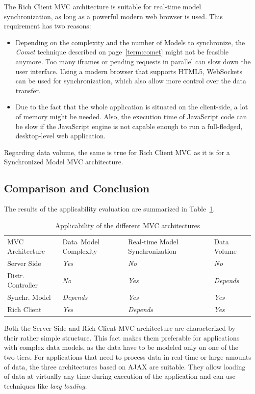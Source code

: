 The Rich Client MVC architecture is suitable for real-time model synchronization, as long as a powerful modern web browser is used. This requirement has two reasons:
\begin{itemize}
	\item Depending on the complexity and the number of Models to synchronize, the \emph{Comet} technique described on page~\ref{term:comet} might not be feasible anymore. Too many iframes or pending requests in parallel can slow down the user interface. Using a modern browser that supports HTML5, WebSockets can be used for synchronization, which also allow more control over the data transfer.
	\item Due to the fact that the whole application is situated on the client-side, a lot of memory might be needed. Also, the execution time of JavaScript code can be slow if the JavaScript engine is not capable enough to run a full-fledged, desktop-level web application.
\end{itemize}

Regarding data volume, the same is true for Rich Client MVC as it is for a Synchronized Model MVC architecture.

\subsection{Comparison and Conclusion}

The results of the applicability evaluation are summarized in Table~\ref{tab:comparison}.

\begin{table}[H]
	\centering
	\begin{tabular}{l p{2.4cm} p{3cm} p{3cm} }
\rowcolor{lightgray}
MVC Architecture & Data\ Model Complexity & Real-time Model Synchronization & Data Volume\\
Server Side & \cellcolor{green}\emph{Yes} & \cellcolor{red}\emph{No} & \cellcolor{red}\emph{No}\\
Distr. Controller & \cellcolor{red}\emph{No} & \cellcolor{green}\emph{Yes} & \emph{Depends}\\
Synchr. Model & \emph{Depends} & \cellcolor{green}\emph{Yes} & \cellcolor{green}\emph{Yes}\\
Rich Client & \cellcolor{green}\emph{Yes} & \emph{Depends} & \cellcolor{green}\emph{Yes}\\
	\end{tabular}
	\caption{Applicability of the different MVC architectures}
	\label{tab:comparison}
\end{table}

Both the Server Side and Rich Client MVC architecture are characterized by their rather simple structure. This fact makes them preferable for applications with complex data models, as the data have to be modeled only on one of the two tiers.
For applications that need to process data in real-time or large amounts of data, the three architectures based on AJAX are suitable. They allow loading of data at virtually any time during execution of the application and can use techniques like \emph{lazy loading}.